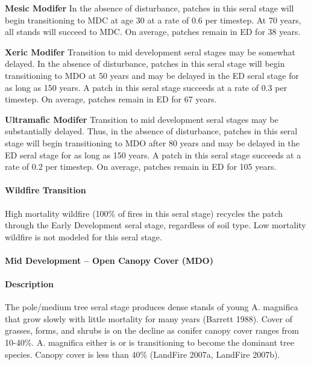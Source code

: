 \begin{adjustwidth}{2cm}{}
\textbf{Mesic Modifer } In the absence of disturbance, patches in this seral stage will begin transitioning to MDC at age 30 at a rate of 0.6 per timestep. At 70 years, all stands will succeed to MDC. On average, patches remain in ED for 38 years.

\textbf{Xeric Modifer}  Transition to mid development seral stages may be somewhat delayed. In the absence of disturbance, patches in this seral stage will begin transitioning to MDO at 50 years and may be delayed in the ED seral stage for as long as 150 years. A patch in this seral stage succeeds at a rate of 0.3 per timestep. On average, patches remain in ED for 67 years.

\textbf{Ultramafic Modifer}  Transition to mid development seral stages may be substantially delayed. Thus, in the absence of disturbance, patches in this seral stage will begin transitioning to MDO after 80 years and may be delayed in the ED seral stage for as long as 150 years. A patch in this seral stage succeeds at a rate of 0.2 per timestep. On average, patches remain in ED for 105 years.

\end{adjustwidth}



\paragraph{Wildfire Transition} High mortality wildfire (100\% of fires in this seral stage) recycles the patch through the Early Development seral stage, regardless of soil type. Low mortality wildfire is not modeled for this seral stage.

\noindent\hrulefill


\paragraph{Mid Development – Open Canopy Cover (MDO)} 

\paragraph{Description} The pole/medium tree seral stage produces dense stands of young A. magnifica that grow slowly with little mortality for many years (Barrett 1988). Cover of grasses, forms, and shrubs is on the decline as conifer canopy cover ranges from 10-40\%. A. magnifica either is or is transitioning to become the dominant tree species. Canopy cover is less than 40\% (LandFire 2007a, LandFire 2007b).

